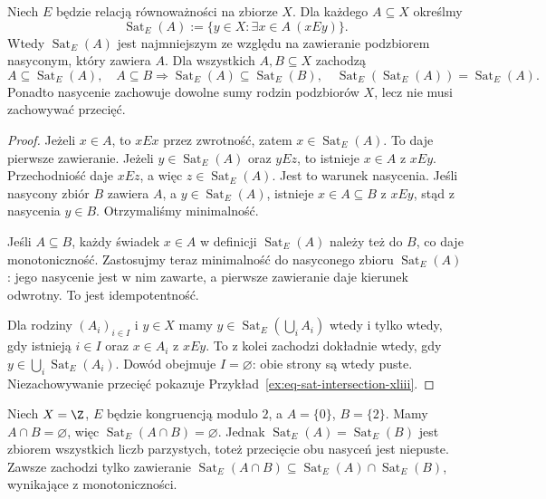 \begin{twierdzenie}
\label{thm:eq-saturation-closure-xliii}
Niech $E$ będzie relacją równoważności na zbiorze $X$.
Dla każdego $A\subseteq X$ określmy
\[
 \operatorname{Sat}_E(A)
 :=\{y\in X:\exists x\in A\ (xEy)\}.
\]
Wtedy $\operatorname{Sat}_E(A)$ jest najmniejszym ze względu
na zawieranie podzbiorem nasyconym, który zawiera $A$.
Dla wszystkich $A,B\subseteq X$ zachodzą
\[
 A\subseteq\operatorname{Sat}_E(A),\quad
 A\subseteq B\Rightarrow
 \operatorname{Sat}_E(A)\subseteq\operatorname{Sat}_E(B),\quad
 \operatorname{Sat}_E(\operatorname{Sat}_E(A))=
 \operatorname{Sat}_E(A).
\]
Ponadto nasycenie zachowuje dowolne sumy rodzin podzbiorów
$X$, lecz nie musi zachowywać przecięć.
\end{twierdzenie}
\begin{proof}
Jeżeli $x\in A$, to $xEx$ przez zwrotność, zatem
$x\in\operatorname{Sat}_E(A)$. To daje pierwsze zawieranie.
Jeżeli $y\in\operatorname{Sat}_E(A)$ oraz $yEz$, to
istnieje $x\in A$ z $xEy$. Przechodniość daje $xEz$,
a więc $z\in\operatorname{Sat}_E(A)$. Jest to warunek
nasycenia. Jeśli nasycony zbiór $B$ zawiera $A$, a
$y\in\operatorname{Sat}_E(A)$, istnieje $x\in A\subseteq B$
z $xEy$, stąd z nasycenia $y\in B$. Otrzymaliśmy
minimalność.

Jeśli $A\subseteq B$, każdy świadek $x\in A$ w definicji
$\operatorname{Sat}_E(A)$ należy też do $B$, co daje
monotoniczność. Zastosujmy teraz minimalność do nasyconego
zbioru $\operatorname{Sat}_E(A)$: jego nasycenie jest
w nim zawarte, a pierwsze zawieranie daje kierunek odwrotny.
To jest idempotentność.

Dla rodziny $(A_i)_{i\in I}$ i $y\in X$ mamy
$y\in\operatorname{Sat}_E(\bigcup_i A_i)$ wtedy i tylko
wtedy, gdy istnieją $i\in I$ oraz $x\in A_i$ z $xEy$.
To z kolei zachodzi dokładnie wtedy, gdy
$y\in\bigcup_i\operatorname{Sat}_E(A_i)$.
Dowód obejmuje $I=\varnothing$: obie strony są wtedy puste.
Niezachowywanie przecięć pokazuje
Przykład~\ref{ex:eq-sat-intersection-xliii}.
\end{proof}
\begin{przyklad}
\label{ex:eq-sat-intersection-xliii}
Niech $X=\Z$, $E$ będzie kongruencją modulo $2$,
a $A=\{0\}$, $B=\{2\}$. Mamy $A\cap B=\varnothing$,
więc $\operatorname{Sat}_E(A\cap B)=\varnothing$.
Jednak $\operatorname{Sat}_E(A)=\operatorname{Sat}_E(B)$
jest zbiorem wszystkich liczb parzystych, toteż przecięcie
obu nasyceń jest niepuste. Zawsze zachodzi tylko zawieranie
$\operatorname{Sat}_E(A\cap B)\subseteq
\operatorname{Sat}_E(A)\cap\operatorname{Sat}_E(B)$,
wynikające z monotoniczności.
\end{przyklad}




